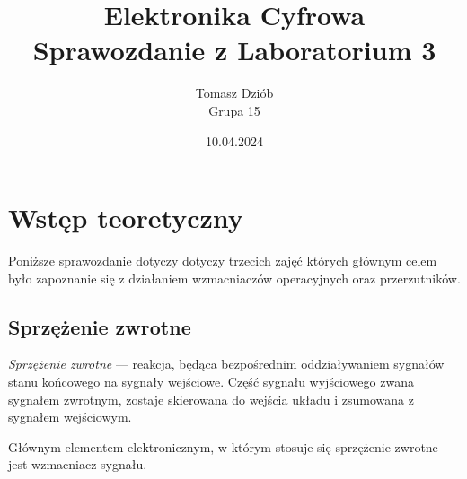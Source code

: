 \documentclass{article}
\begin{document}
  \pagestyle{fancy} %
  \fancyhf{} %
  \fancyfoot[C]{\thepage}
  \renewcommand{\headrulewidth}{0pt} %
  \renewcommand{\footrulewidth}{0.4pt} %
  \addtolength{\footskip}{0cm} %

  \title{Elektronika Cyfrowa \\ {\large Sprawozdanie z Laboratorium 3}}
  \date{10.04.2024}
  \author{Tomasz Dziób\\{\small Grupa 15}}
  \maketitle

  \setcounter{tocdepth}{4} %
  \setcounter{secnumdepth}{4} %
  \tableofcontents
  \pagebreak
  \section{Wstęp teoretyczny}
  Poniższe sprawozdanie dotyczy dotyczy trzecich zajęć których głównym celem było zapoznanie się z działaniem wzmacniaczów operacyjnych oraz przerzutników. 
    \subsection{Sprzężenie zwrotne}
      \textit{Sprzężenie zwrotne} --- reakcja, będąca bezpośrednim oddziaływaniem sygnałów stanu końcowego na sygnały wejściowe. Część sygnału wyjściowego zwana sygnałem zwrotnym, zostaje skierowana do wejścia układu i zsumowana  z sygnałem wejściowym.

      Głównym elementem elektronicznym, w którym stosuje się sprzężenie zwrotne jest wzmacniacz sygnału.
\end{document}

